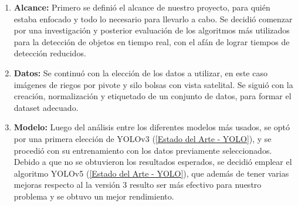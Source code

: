 \begin{enumerate}
    \item \textbf{Alcance:} Primero se definió el alcance de nuestro proyecto, para quién estaba enfocado y todo lo necesario para llevarlo a cabo. Se decidió comenzar por una investigación y posterior evaluación de los algoritmos más utilizados para la detección de objetos en tiempo real, con el afán de lograr tiempos de detección reducidos.
    \item \textbf{Datos:} Se continuó con la elección de los datos a utilizar, en este caso imágenes de riegos por pivote y silo bolsas con vista satelital. Se siguió con la creación, normalización y etiquetado de un conjunto de datos, para formar el dataset adecuado.
    \item \textbf{Modelo:} Luego del análisis entre los diferentes modelos más usados, se optó por una primera elección de YOLOv3 (\ref{Estado del Arte - YOLO}), y se procedió con su entrenamiento con los datos previamente seleccionados. Debido a que no se obtuvieron los resultados esperados, se decidió emplear el algoritmo YOLOv5 (\ref{Estado del Arte - YOLO}), que además de tener varias mejoras respecto al la versión 3 resulto ser más efectivo para nuestro problema y se obtuvo un mejor rendimiento.
    

\end{enumerate}
